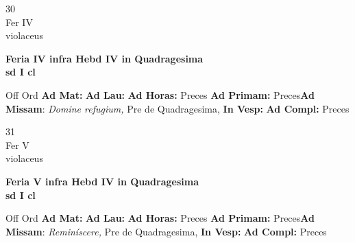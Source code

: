 \documentclass[10pt, openany]{book}
\begin{document}
        \begin{center}
            \begin{minipage}{3.5in}
                \vspace{2em}
                \begin{minipage}{0.5in}
                    {\Huge 30} \\
                    {\normalsize Fer IV} \\
                    {\normalsize violaceus}
                \end{minipage}
                \begin{minipage}{3.0in}
                    \textbf{ \large Feria IV infra Hebd IV in Quadragesima  \\
                    \textnormal{\normalsize sd I cl}} \\ 
                \end{minipage}
                \begin{justify}Off Ord
                    \textbf{Ad Mat: }
                    \textbf{Ad Lau: }
                    \textbf{Ad Horas: }Preces
                    \textbf{Ad Primam: }Preces\textbf{Ad Missam}: \textit{Domine refugium,} Pre de Quadragesima,  
                    \textbf{In Vesp: }
                    \textbf{Ad Compl: }Preces
                \end{justify}
            \end{minipage}
        \end{center}
    
        \begin{center}
            \begin{minipage}{3.5in}
                \vspace{2em}
                \begin{minipage}{0.5in}
                    {\Huge 31} \\
                    {\normalsize Fer V} \\
                    {\normalsize violaceus}
                \end{minipage}
                \begin{minipage}{3.0in}
                    \textbf{ \large Feria V infra Hebd IV in Quadragesima  \\
                    \textnormal{\normalsize sd I cl}} \\ 
                \end{minipage}
                \begin{justify}Off Ord
                    \textbf{Ad Mat: }
                    \textbf{Ad Lau: }
                    \textbf{Ad Horas: }Preces
                    \textbf{Ad Primam: }Preces\textbf{Ad Missam}: \textit{Reminíscere,} Pre de Quadragesima,  
                    \textbf{In Vesp: }
                    \textbf{Ad Compl: }Preces
                \end{justify}
            \end{minipage}
        \end{center}
    
\end{document}
